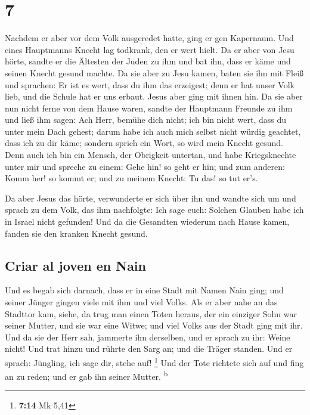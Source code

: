 \hypertarget{section-6}{%
\section{7}\label{section-6}}

 Nachdem er aber vor dem Volk ausgeredet hatte, ging er
gen Kapernaum.  Und eines Hauptmanns Knecht lag todkrank,
den er wert hielt.  Da er aber von Jesu hörte, sandte er
die Ältesten der Juden zu ihm und bat ihn, dass er käme und seinen
Knecht gesund machte.  Da sie aber zu Jesu kamen, baten
sie ihn mit Fleiß und sprachen: Er ist es wert, dass du ihm das
erzeigest;  denn er hat unser Volk lieb, und die Schule
hat er uns erbaut.  Jesus aber ging mit ihnen hin. Da sie
aber nun nicht ferne von dem Hause waren, sandte der Hauptmann Freunde
zu ihm und ließ ihm sagen: Ach Herr, bemühe dich nicht; ich bin nicht
wert, dass du unter mein Dach gehest;  darum habe ich auch
mich selbst nicht würdig geachtet, dass ich zu dir käme; sondern sprich
ein Wort, so wird mein Knecht gesund.  Denn auch ich bin
ein Mensch, der Obrigkeit untertan, und habe Kriegsknechte unter mir und
spreche zu einem: Gehe hin! so geht er hin; und zum anderen: Komm her!
so kommt er; und zu meinem Knecht: Tu das! so tut er's.

 Da aber Jesus das hörte, verwunderte er sich über ihn und
wandte sich um und sprach zu dem Volk, das ihm nachfolgte: Ich sage
euch: Solchen Glauben habe ich in Israel nicht gefunden! 
Und da die Gesandten wiederum nach Hause kamen, fanden sie den kranken
Knecht gesund.

\hypertarget{criar-al-joven-en-nain}{%
\subsection{Criar al joven en Nain}\label{criar-al-joven-en-nain}}

 Und es begab sich darnach, dass er in eine Stadt mit
Namen Nain ging; und seiner Jünger gingen viele mit ihm und viel Volks.
 Als er aber nahe an das Stadttor kam, siehe, da trug man
einen Toten heraus, der ein einziger Sohn war seiner Mutter, und sie war
eine Witwe; und viel Volks aus der Stadt ging mit ihr. 
Und da sie der Herr sah, jammerte ihn derselben, und er sprach zu ihr:
Weine nicht!  Und trat hinzu und rührte den Sarg an; und
die Träger standen. Und er sprach: Jüngling, ich sage dir, stehe auf!
\footnote{\textbf{7:14} Mk 5,41}  Und der Tote richtete
sich auf und fing an zu reden; und er gab ihn seiner Mutter.
\textsuperscript{b}

